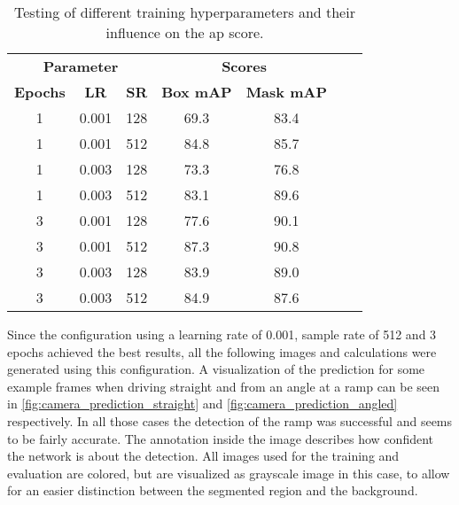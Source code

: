 \begin{table}[htb]
    \centering
    \caption[Detection evaluation]{Testing of different training hyperparameters and their influence on the \acrshort{ap} score.}
    \label{tab:detection_eval}
    \begin{tabular}{ccccccc}
        \toprule
        \multicolumn{3}{c}{\textbf{Parameter} } & \multicolumn{2}{c}{\textbf{Scores} }                                                      \\
        \cmidrule(lr){1-3}                       \cmidrule(lr){4-5}
        \textbf{Epochs}                         & \textbf{LR}                          & \textbf{SR} & \textbf{Box mAP} & \textbf{Mask mAP} \\
        \midrule
        1                                       & 0.001                                & 128         & 69.3             & 83.4              \\
        1                                       & 0.001                                & 512         & 84.8             & 85.7              \\
        1                                       & 0.003                                & 128         & 73.3             & 76.8              \\
        1                                       & 0.003                                & 512         & 83.1             & 89.6              \\
        3                                       & 0.001                                & 128         & 77.6             & 90.1              \\
        3                                       & 0.001                                & 512         & 87.3             & 90.8              \\
        3                                       & 0.003                                & 128         & 83.9             & 89.0              \\
        3                                       & 0.003                                & 512         & 84.9             & 87.6              \\
        \bottomrule
    \end{tabular}
\end{table}
Since the configuration using a learning rate of 0.001, sample rate of 512 and 3 epochs achieved the best results, all the following images and calculations were generated using this configuration.
A visualization of the prediction for some example frames when driving straight and from an angle at a ramp can be seen in \cref{fig:camera_prediction_straight} and \cref{fig:camera_prediction_angled} respectively.
In all those cases the detection of the ramp was successful and seems to be fairly accurate.
The annotation inside the image describes how confident the network is about the detection.
All images used for the training and evaluation are colored, but are visualized as grayscale image in this case, to allow for an easier distinction between the segmented region and the background.

